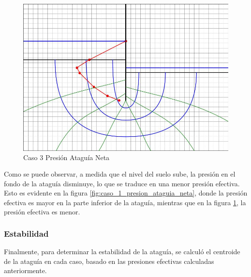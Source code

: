 \begin{figure}[H]
\begin{minipage}{0.32\textwidth}
        \centering
        \includegraphics[width=\textwidth]{GRAFICOS/caso_3_presion_ataguia_neta.jpg}
        \caption{Caso 3 Presión Ataguía Neta}
        \label{fig:caso_3_presion_ataguia_neta}
    \end{minipage}
\end{figure}

Como se puede observar, a medida que el nivel del suelo sube, la presión en el fondo de la ataguía disminuye, lo que se traduce en una menor presión efectiva. Esto es evidente en la figura \ref{fig:caso_1_presion_ataguia_neta}, donde la presión efectiva es mayor en la parte inferior de la ataguía, mientras que en la figura \ref{fig:caso_3_presion_ataguia_neta}, la presión efectiva es menor.

\subsubsection{Estabilidad}
Finalmente, para determinar la estabilidad de la ataguía, se calculó el centroide de la ataguía en cada caso, basado en las presiones efectivas calculadas anteriormente.

